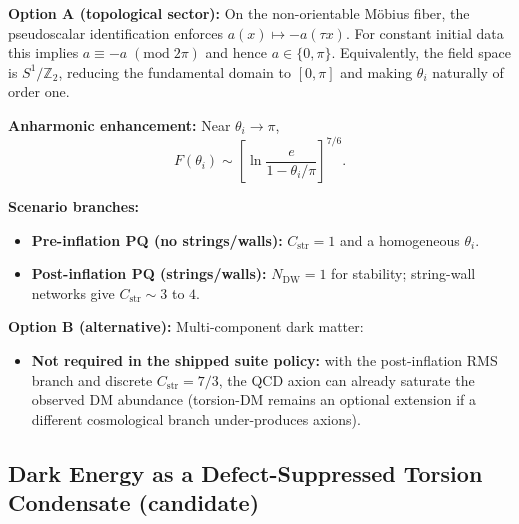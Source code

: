 \begin{tcolorbox}[colback=yellow!5, colframe=yellow!60!black, 
    title={\textbf{Resolution: Topologically Preferred $\theta_i$}}, fonttitle=\bfseries\small]
\textbf{Option A (topological sector):} On the non-orientable M\"obius fiber, the pseudoscalar
identification enforces $a(x)\mapsto -a(\tau x)$. For constant initial data this implies
$a \equiv -a \;(\mathrm{mod}\;2\pi)$ and hence $a \in \{0,\pi\}$. Equivalently, the field space
is $S^1/\mathbb{Z}_2$, reducing the fundamental domain to $[0,\pi]$ and making $\theta_i$
naturally of order one.

\textbf{Anharmonic enhancement:} Near $\theta_i \to \pi$,
\begin{equation}
    F(\theta_i) \sim \left[\ln\frac{e}{1 - \theta_i/\pi}\right]^{7/6}.
\end{equation}

\textbf{Scenario branches:}
\begin{itemize}[leftmargin=1.5em, topsep=2pt, itemsep=1pt]
    \item \textbf{Pre-inflation PQ (no strings/walls):} $C_{\mathrm{str}}=1$ and a homogeneous $\theta_i$.
    \item \textbf{Post-inflation PQ (strings/walls):} $N_{\mathrm{DW}}=1$ for stability; string-wall networks give $C_{\mathrm{str}}\sim 3$ to $4$.
\end{itemize}

\textbf{Option B (alternative):} Multi-component dark matter:
\begin{itemize}[leftmargin=1.5em, topsep=2pt, itemsep=1pt]
    \item \textbf{Not required in the shipped suite policy:} with the post-inflation RMS branch and discrete $C_{\mathrm{str}}=7/3$, the QCD axion can already saturate the observed DM abundance (torsion-DM remains an optional extension if a different cosmological branch under-produces axions).
\end{itemize}
\end{tcolorbox}

\subsection{Dark Energy as a Defect-Suppressed Torsion Condensate (candidate)}
\label{sec:dark-energy}

